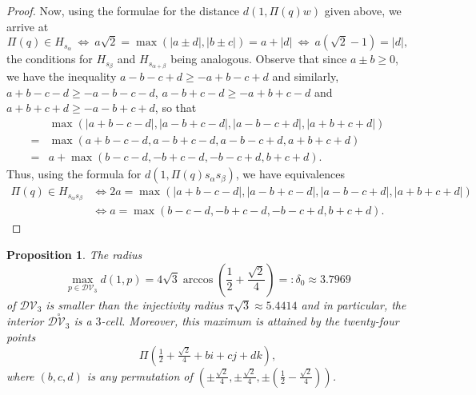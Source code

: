 \documentclass[11pt,twoside]{amsart}
\theoremstyle{plain}
\newtheorem{prop}{Proposition}[section]
\begin{document}
\begin{proof}
Now, using the formulae for the distance $d(1,\Pi(q)w)$ given above, we arrive at
\[\Pi(q)\in H_{s_\alpha}~\Longleftrightarrow~a\sqrt{2}=\max(|a\pm d|,|b\pm c|)=a+|d|~\Longleftrightarrow~a(\sqrt{2}-1)=|d|,\]
the conditions for $H_{s_\beta}$ and $H_{s_{\alpha+\beta}}$ being analogous. 
Observe that since $a\pm b\ge0$, we have the inequality $a-b-c+d\ge -a+b-c+d$ and similarly, $a+b-c-d\ge -a-b-c-d$, $a-b+c-d\ge -a+b+c-d$ and $a+b+c+d\ge -a-b+c+d$, so that
\begin{align*}
&\max(|a+b-c-d|,|a-b+c-d|,|a-b-c+d|,|a+b+c+d|) \\
=&\max(a+b-c-d,a-b+c-d,a-b-c+d,a+b+c+d) \\
=&a+\max(b-c-d,-b+c-d,-b-c+d,b+c+d).
\end{align*}
Thus, using the formula for $d(1,\Pi(q)s_\alpha s_\beta)$, we have equivalences
\begin{align*}
\Pi(q)\in H_{s_\alpha s_\beta}&\Longleftrightarrow 2a=\max(|a+b-c-d|,|a-b+c-d|,|a-b-c+d|,|a+b+c+d|) \\ 
&\Longleftrightarrow a=\max(b-c-d,-b+c-d,-b-c+d,b+c+d).
\end{align*}
\end{proof}

\begin{prop}\label{DVisokforSO(3)}
The radius
\[\max_{p\in\mathcal{DV}_3}d(1,p)=4\sqrt{3}\arccos\left(\frac{1}{2}+\frac{\sqrt{2}}{4}\right)=:\delta_0\approx3.7969\]
of $\mathcal{DV}_3$ is smaller than the injectivity radius $\pi\sqrt{3}\approx5.4414$ and in particular, the interior $\stackrel{\circ}{\mathcal{DV}_3}$ is a $3$-cell. Moreover, this maximum is attained by the twenty-four points
\[\Pi\left({\tfrac{1}{2}+\tfrac{\sqrt{2}}{4}+bi+cj+dk}\right),\]
where $(b,c,d)$ is any permutation of $\left(\pm\tfrac{\sqrt{2}}{4},\pm\tfrac{\sqrt{2}}{4},\pm\left(\tfrac{1}{2}-\tfrac{\sqrt{2}}{4}\right)\right)$.
\end{prop}
\end{document}

